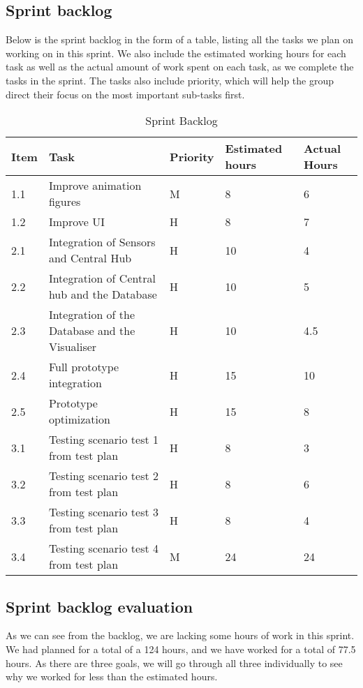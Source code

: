\documentclass[../document]{subfiles}
\begin{document}
\subsection{Sprint backlog}

Below is the sprint backlog in the form of a table, listing all the tasks we plan on working on in this sprint. We also include the estimated working hours for each task as well as the actual amount of work spent on each task, as we complete the tasks in the sprint. The tasks also include priority, which will help the group direct their focus on the most important sub-tasks first.

\begin{table}[H]
\caption{Sprint Backlog}
\centering
\begin{tabularx}{\textwidth}{|l|X|l|l|l|}
\hline
	Item
	&Task
	&Priority
	&Estimated hours
	&Actual Hours
	\\ \hline 1.1
	&Improve animation figures
	&M
	&8
	&6
	\\ \hline 1.2
	&Improve UI
	&H
	&8
	&7
	\\ \hline 2.1
	&Integration of Sensors and Central Hub
	&H
	&10
	&4
	\\ \hline 2.2
	&Integration of Central hub and the Database
	&H
	&10
	&5
	\\ \hline 2.3
	&Integration of the Database and the Visualiser
	&H
	&10
	&4.5
	\\ \hline 2.4
	&Full prototype integration
	&H
	&15
	&10
	\\ \hline 2.5
	&Prototype optimization
	&H
	&15
	&8
	\\ \hline 3.1
	&Testing scenario test 1 from test plan
	&H
	&8
	&3
	\\ \hline 3.2
	&Testing scenario test 2 from test plan
	&H
	&8
	&6
	\\ \hline 3.3
	&Testing scenario test 3 from test plan
	&H
	&8
	&4
	\\ \hline 3.4
	&Testing scenario test 4 from test plan
	&M
	&24\footnotemark[1]
	&24
	\\ \hline 
\end{tabularx}
\end{table}


\subsection{Sprint backlog evaluation}
As we can see from the backlog, we are lacking some hours of work in this sprint. We had planned for a total of a 124 hours, and we have worked for a total of 77.5 hours. As there are three goals, we will go through all three individually to see why we worked for less than the estimated hours.
\end{document}
